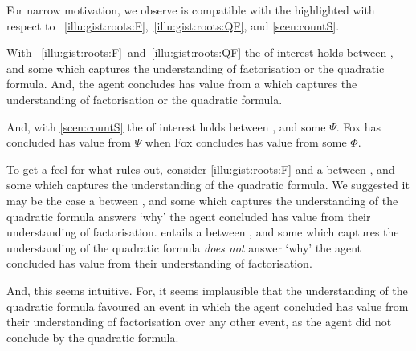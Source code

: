 \begin{note}
  For narrow motivation, we observe \issueInclusion{} is compatible with the  highlighted with respect to ~\ref{illu:gist:roots:F},~\ref{illu:gist:roots:QF}, and \ref{scen:countS}.

  With ~\ref{illu:gist:roots:F}~and~\ref{illu:gist:roots:QF} the \ros{} of interest holds between \propM{\rootsCon{}},  and some \pool{} which captures the \agents{} understanding of factorisation or the quadratic formula.
  And, the agent concludes \propM{\rootsCon{}} has value  from a \pool{} which captures the \agents{} understanding of factorisation or the quadratic formula.

  And, with \autoref{scen:countS} the \ros{} of interest holds between ,  and some \pool{} \(\Psi\).
  Fox has concluded  has value  from \(\Psi\) when Fox concludes \propI{\signConA{}} has value  from some \pool{} \(\Phi\).
\end{note}


\begin{note}
  To get a feel for what \issueInclusion{} rules out, consider \autoref{illu:gist:roots:F} and a \ros{} between \propM{\rootsCon{}},  and some \pool{} which captures the \agents{} understanding of the quadratic formula.
  We suggested it may be the case a \ros{} between \propM{\rootsCon{}},  and some \pool{} which captures the \agents{} understanding of the quadratic formula answers `why' the agent concluded \propM{\rootsCon{}} has value  from their understanding of factorisation.
  \issueInclusion{} entails a \ros{} between \propM{\rootsCon{}},  and some \pool{} which captures the \agents{} understanding of the quadratic formula \emph{does not} answer `why' the agent concluded \propM{\rootsCon{}} has value  from their understanding of factorisation.

  And, this seems intuitive.
  For, it seems implausible that the \agents{} understanding of the quadratic formula favoured an event in which the agent concluded \propM{\rootsCon{}} has value  from their understanding of factorisation over any other event, as the agent did not conclude by the quadratic formula.

  
\end{note}


